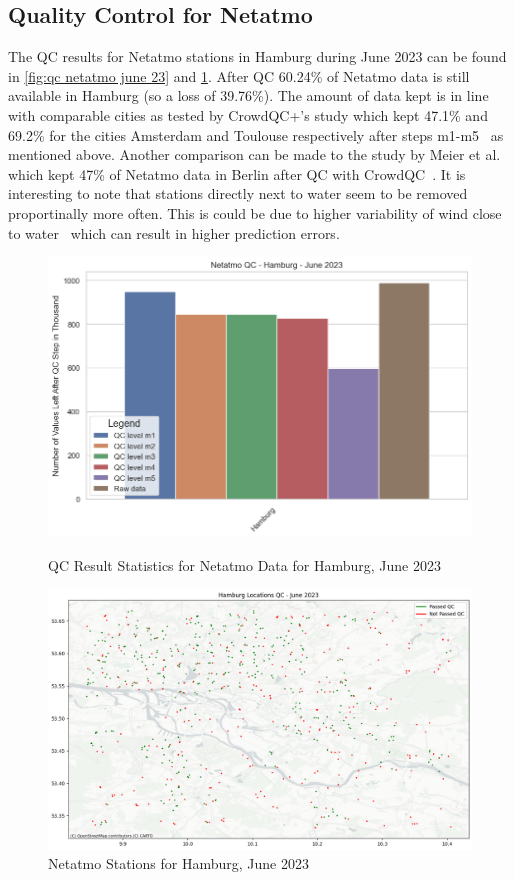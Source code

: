 \subsection{Quality Control for Netatmo}

The QC results for Netatmo stations in Hamburg during June 2023 can be found in \ref{fig:qc netatmo june 23} and \ref{fig:qc netatmo hamburg june 23}.
After QC 60.24\% of Netatmo data is still available in Hamburg (so a loss of 39.76\%). The amount of data kept is in line with comparable cities as tested by CrowdQC+'s study which kept 47.1\% and 69.2\% for the cities Amsterdam and Toulouse respectively after steps m1-m5~\cite{fenner2021crowdqc+} as mentioned above. Another comparison can be made to the study by Meier et al. which kept 47\% of Netatmo data in Berlin after QC with CrowdQC~\cite{meier2017crowdsourcing}.
It is interesting to note that stations directly next to water seem to be removed proportinally more often. This is could be due to higher variability of wind close to water~\cite{ho2014mapping} which can result in higher prediction errors.

\begin{figure}[htp]
    \centering
    \includegraphics[width=1\textwidth]{images/netatmo_qc_june_23.png}
    \caption{QC Result Statistics for Netatmo Data for Hamburg, June 2023}
    \label{fig:qc netatmo june 23}

    \includegraphics[width=1\textwidth]{images/netatmo_hamburg_qc_june_23.png}
    \caption{Netatmo Stations for Hamburg, June 2023}
    \label{fig:qc netatmo hamburg june 23}
\end{figure}

